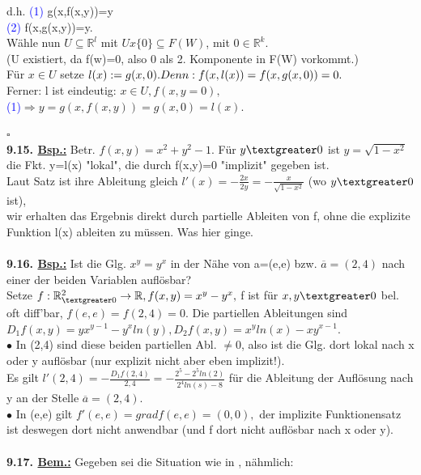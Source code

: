 \documentclass[]{scrartcl}
\newcommand{\blueul}[1]{\setulcolor{blue}{\ul{#1}}}
\begin{document}
	d.h. \textcolor{blue}{(1)} g(x,f(x,y))=y\\
	\textcolor{blue}{(2)} f(x,g(x,y))=y.\\
	Wähle nun $U\subseteq \mathbb{R}^l$ mit $U x \{0\}\subseteq F(W)$, mit 0$\in\mathbb{R}^k.$\\
	(U existiert, da f(w)=0, also 0 als 2. Komponente in F(W) vorkommt.)\\
	Für $x \in U$ setze $l(x):= g(x,0).\\
	Denn: f(x,l(x))=f(x,g(x,0))=0.$\\
	Ferner: l ist eindeutig: $x\in U,f(x,y =0),$\\
	\textcolor{blue}{(1)}$\Rightarrow y = g(x,f(x,y))=g(x,0)=l(x).$\\
	\strut\hfill$\square$\\
	\textbf{9.15. \underline{Bsp.:}} Betr. $f(x,y)=x^2+y^2-1$. Für $y\textgreater0$ ist $y=\sqrt{1-x^2}$ die Fkt. y=l(x) "lokal", die durch f(x,y)=0 "implizit" gegeben ist.\\
	Laut Satz ist ihre Ableitung gleich $l'(x)=-\frac{2x}{2y}=-\frac{x}{\sqrt{1-x^2}}$ (wo $y\textgreater0$ ist),\\
	wir erhalten das Ergebnis direkt durch partielle Ableiten von f, ohne die explizite Funktion l(x) ableiten zu müssen. \textopencorner Was hier ginge.\textcorner\\
	\\
	\textbf{9.16. \underline{Bsp.:}} Ist die Glg. $x^y=y^x$ in der Nähe von a=(e,e) bzw. $\overline{a}=(2,4)$ nach einer der beiden Variablen auflösbar?\\
	Setze $f:\mathbb{R}^2_{\textgreater0}\rightarrow\mathbb{R}, f(x,y)=x^y-y^x,$ f ist für $x,y \textgreater0$ bel. oft diff'bar, $f(e,e)=f(2,4)=0.$ Die partiellen Ableitungen sind $D_1f(x,y)=yx^{y-1}-y^xln(y), D_2f(x,y)=x^yln(x)-xy^{x-1}.$\\
	$\bullet$ In (2,4) sind diese beiden partiellen Abl. $\neq 0$, also ist die Glg. dort lokal nach x oder y auflösbar (nur explizit nicht aber eben implizit!).\\
	Es gilt $l'(2,4)=-\frac{D_1f(2,4)}{2,4}=-\frac{2^5-2^5ln(2)}{2^4ln(s)-8}$ für die Ableitung der Auflösung nach y an der Stelle $\overline{a}=(2,4).$\\
	$\bullet$ In (e,e) gilt $f'(e,e)=grad f(e,e)=(0,0),$ der implizite Funktionensatz ist deswegen dort nicht anwendbar (und f dort nicht auflösbar nach x oder y).\\
	\\
	\textbf{9.17. \underline{Bem.:}} Gegeben sei die Situation wie in \blueul{9.3}, nähmlich:\\
\end{document}
